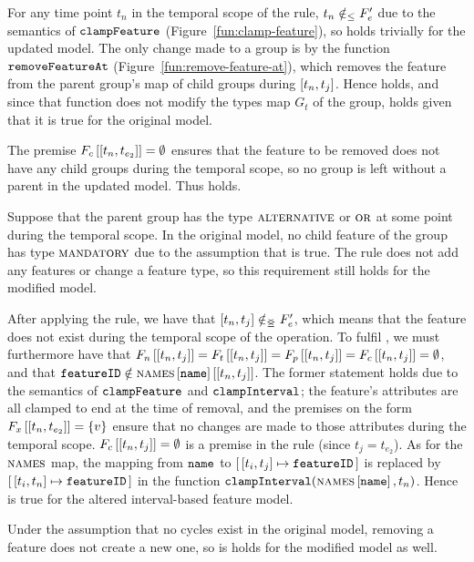 For any time point $t_n$ in the temporal scope of the rule, $t_n \notin_\leq F'_e$ due to the semantics of $\texttt{clampFeature}$ (Figure~\vref{fun:clamp-feature}), so  holds trivially for the updated model.  The only change made to a group is by the function $\texttt{removeFeatureAt}$ (Figure~\vref{fun:remove-feature-at}), which removes the feature from the parent group's map of child groups during $\interval{t_n}{t_j}$. Hence  holds, and since that function does not modify the types map $G_t$ of the group,  holds given that it is true for the original model. 

The premise $\lookup{F_c}{\interval{t_n}{t_{e_2}}} = \emptyset$ ensures that the feature to be removed does not have any child groups during the temporal scope, so no group is left without a parent in the updated model. Thus  holds. 

Suppose that the parent group has the type $\textsc{alternative}{}$ or $\textsc{or}{}$ at some point during the temporal scope. In the original model, no child feature of the group has type $\textsc{mandatory}{}$ due to the assumption that  is true. The  rule does not add any features or change a feature type, so this requirement still holds for the modified model. 

After applying the rule, we have that $\interval{t_n}{t_j} \notinnr F'_e$, which means that the feature does not exist during the temporal scope of the operation. To fulfil , we must furthermore have that $\lookup{F_n}{\interval{t_n}{t_j}} = \lookup{F_t}{\interval{t_n}{t_j}}= \lookup{F_p}{\interval{t_n}{t_j}} = \lookup{F_c}{\interval{t_n}{t_j}} = \emptyset$, and that $\var{featureID} \notin \lookup{\lookup{\names}{\var{name}}}{\interval{t_n}{t_j}}$. The former statement holds due to the semantics of $\texttt{clampFeature}$ and $\texttt{clampInterval}$; the feature's attributes are all clamped to end at the time of removal, and the premises on the form $\lookup{F_x}{\interval{t_n}{t_{e_2}}} = \set{v}$ ensure that no changes are made to those attributes during the temporal scope. $\lookup{F_c}{\interval{t_n}{t_j}} = \emptyset$ is a premise in the rule (since $t_j = t_{e_2}$). As for the $\textsc{names}$ map, the mapping from $\texttt{name}$ to $\intervalmapping{t_i}{t_j}{\var{featureID}}$ is replaced by $\intervalmapping{t_i}{t_n}{\var{featureID}}$ in the function $\texttt{clampInterval}(\textsc{names} \left[ \texttt{name} \right], t_n)$. Hence  is true for the altered interval-based feature model.

Under the assumption that no cycles exist in the original model, removing a feature does not create a new one, so  is holds for the modified model as well.
\\

